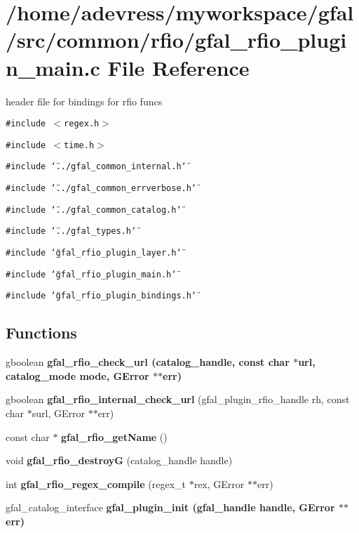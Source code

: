 \section{/home/adevress/myworkspace/gfal/src/common/rfio/gfal\_\-rfio\_\-plugin\_\-main.c File Reference}
\label{gfal__rfio__plugin__main_8c}
header file for bindings for rfio funcs 

{\tt \#include $<$regex.h$>$}\par
{\tt \#include $<$time.h$>$}\par
{\tt \#include \char`\"{}../gfal\_\-common\_\-internal.h\char`\"{}}\par
{\tt \#include \char`\"{}../gfal\_\-common\_\-errverbose.h\char`\"{}}\par
{\tt \#include \char`\"{}../gfal\_\-common\_\-catalog.h\char`\"{}}\par
{\tt \#include \char`\"{}../gfal\_\-types.h\char`\"{}}\par
{\tt \#include \char`\"{}gfal\_\-rfio\_\-plugin\_\-layer.h\char`\"{}}\par
{\tt \#include \char`\"{}gfal\_\-rfio\_\-plugin\_\-main.h\char`\"{}}\par
{\tt \#include \char`\"{}gfal\_\-rfio\_\-plugin\_\-bindings.h\char`\"{}}\par
\subsection*{Functions}
\begin{CompactItemize}
\item 
gboolean \bf{gfal\_\-rfio\_\-check\_\-url} (catalog\_\-handle, const char $\ast$url, catalog\_\-mode mode, GError $\ast$$\ast$err)
\item 
gboolean \textbf{gfal\_\-rfio\_\-internal\_\-check\_\-url} (gfal\_\-plugin\_\-rfio\_\-handle rh, const char $\ast$surl, GError $\ast$$\ast$err)\label{gfal__rfio__plugin__main_8c_4d6d0d6d7f4bdfa39ceac7ac58cceabc}

\item 
const char $\ast$ \textbf{gfal\_\-rfio\_\-get\-Name} ()\label{gfal__rfio__plugin__main_8c_52d0ae5bb90146d1c3859f7eafa517fa}

\item 
void \textbf{gfal\_\-rfio\_\-destroy\-G} (catalog\_\-handle handle)\label{gfal__rfio__plugin__main_8c_5d5e134df56b9dab9254ac9ba04c7671}

\item 
int \textbf{gfal\_\-rfio\_\-regex\_\-compile} (regex\_\-t $\ast$rex, GError $\ast$$\ast$err)\label{gfal__rfio__plugin__main_8c_8d2d826bd27dfab8db31fda65727b6a2}

\item 
gfal\_\-catalog\_\-interface \bf{gfal\_\-plugin\_\-init} (gfal\_\-handle handle, GError $\ast$$\ast$err)
\end{CompactItemize}


